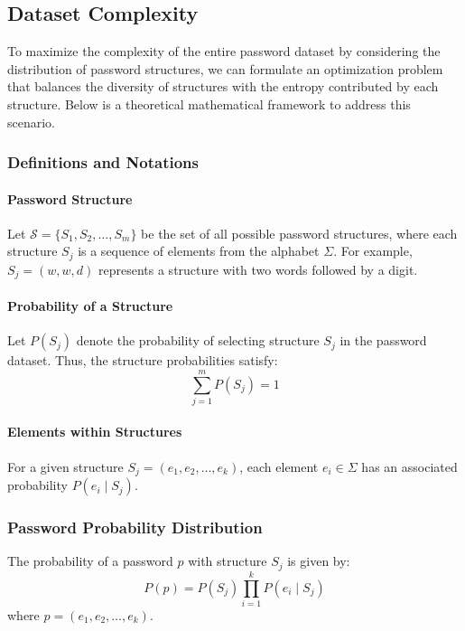 \subsection{Dataset Complexity}

To maximize the complexity of the entire password dataset by considering the distribution of password structures, we can formulate an optimization problem that balances the diversity of structures with the entropy contributed by each structure. Below is a theoretical mathematical framework to address this scenario.

\subsubsection{Definitions and Notations}

\paragraph{Password Structure} Let \( \mathcal{S} = \{ S_1, S_2, \dots, S_m \} \) be the set of all possible password structures, where each structure \( S_j \) is a sequence of elements from the alphabet \( \Sigma \). For example, \( S_j = (w, w, d) \) represents a structure with two words followed by a digit.

\paragraph{Probability of a Structure} Let \( P(S_j) \) denote the probability of selecting structure \( S_j \) in the password dataset. Thus, the structure probabilities satisfy:
  \[
  \sum_{j=1}^{m} P(S_j) = 1
  \]

\paragraph{Elements within Structures} For a given structure \( S_j = (e_1, e_2, \dots, e_k) \), each element \( e_i \in \Sigma \) has an associated probability \( P(e_i \mid S_j) \).

\subsubsection{Password Probability Distribution}

The probability of a password \( p \) with structure \( S_j \) is given by:
\[
P(p) = P(S_j) \prod_{i=1}^{k} P(e_i \mid S_j)
\]
where \( p = (e_1, e_2, \dots, e_k) \).

